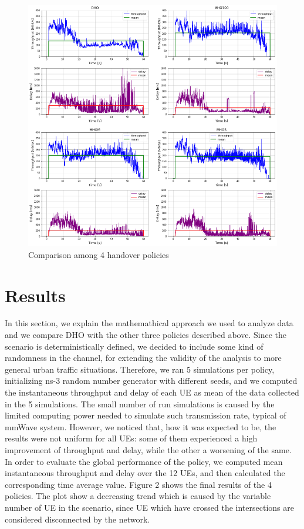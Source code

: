 \documentclass[conference,10pt]{IEEEtran}
\begin{document}
\begin{figure}[h]
	\begin{center}
		\includegraphics[scale=0.85]{images/confronto.png}
		\caption{Comparison among 4 handover policies}
	\end{center}
\end{figure}


\section{Results}\label{sec:res}
In this section, we explain the mathemathical approach we used to analyze data and we compare DHO with the other three policies described above.
Since the scenario is deterministically defined, we decided to include some kind of randomness in the channel, for extending the validity of the analysis to more general urban traffic situations. Therefore, we ran 5 simulations per policy, initializing ns-3 random number generator with different seeds, and we computed the instantaneous throughput and delay of each UE as mean of the data collected in the 5 simulations. The small number of run simulations is caused by the limited computing power needed to simulate such transmission rate, typical of mmWave system. However, we noticed that, how it was expected to be, the results were not uniform for all UEs: some of them experienced a high improvement of throughput and delay, while the other a worsening of the same. In order to evaluate the global performance of the policy, we computed mean instantaneous throughput and delay over the 12 UEs, and then calculated the corresponding time average value.
Figure 2 shows the final results of the 4 policies. The plot show a decreasing trend which is caused by the variable number of UE in the scenario, since UE which have crossed the intersections are considered disconnected by the network.
\end{document}

